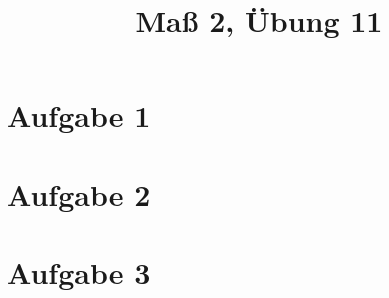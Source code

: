 \documentclass[]{article}
\author{}
\title{Maß 2, Übung 11}
\begin{document}
    \begin{titlepage}
        \maketitle
    \end{titlepage}
    
    \section{Aufgabe 1}
    
    \section{Aufgabe 2}
    
    \section{Aufgabe 3}
    

    
    
\end{document}
